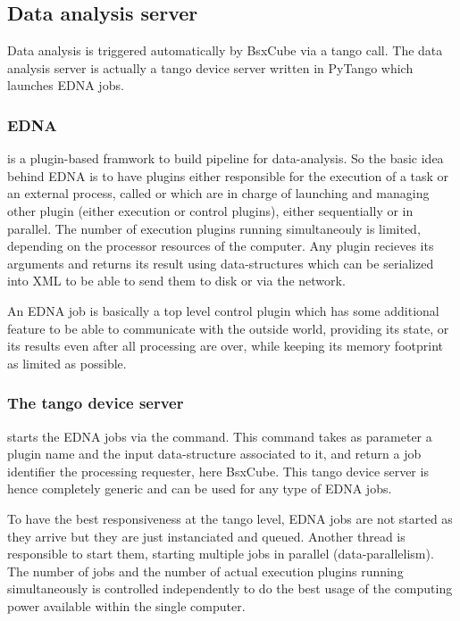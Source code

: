 \documentclass[preprint]{iucr}              %
\begin{document}
\subsection{Data analysis server}

Data analysis is triggered automatically by BsxCube via a tango call. 
The data analysis server is actually a tango device server written in
PyTango\cite{pytango} which launches EDNA jobs\cite{edna}.  


\subsubsection{EDNA} is a plugin-based framwork to build pipeline for
data-analysis. So the basic idea behind EDNA is to have plugins either responsible for the execution
of a task or an external process, called  or
 which are in charge of launching and managing other
plugin (either execution or control plugins), either sequentially or in
parallel. 
The number of execution plugins running simultaneouly is limited,
depending on the processor resources of the computer.
Any plugin recieves its
arguments and returns its result using data-structures which can be serialized
into XML to be able to send them to disk or via the network. 

An EDNA job is basically a top level control plugin which has some additional
feature to be able to communicate with the outside world, providing its state,
or its results even after all processing are over, while keeping its memory
footprint as limited as possible. 

\subsubsection{The tango device server} starts the EDNA
jobs via the  command. This command takes as parameter a 
plugin name and the input data-structure associated to it, and return a job
identifier the processing requester, here BsxCube.
This tango device server is hence completely generic and can be used for any
type of EDNA jobs.

To have the best responsiveness at the tango level, EDNA jobs are not started as
they arrive but they are just instanciated and queued.  
Another thread is
responsible to start them, starting multiple jobs in parallel
(data-parallelism). The number of jobs and the number of actual execution
plugins running simultaneously is controlled independently to do the best usage
of the computing power available within the  single computer.
\end{document}
